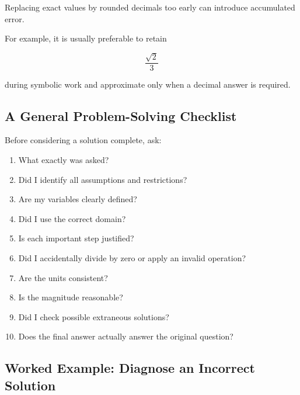 Replacing exact values by rounded decimals too early can introduce accumulated
error.

For example, it is usually preferable to retain

\[ \frac{\sqrt2}{3} \]

during symbolic work and approximate only when a decimal answer is required.

\subsection{A General Problem-Solving Checklist}
\label{subsec:problem-solving-checklist}

Before considering a solution complete, ask:

\begin{enumerate}
    \item What exactly was asked?
    \item Did I identify all assumptions and restrictions?
    \item Are my variables clearly defined?
    \item Did I use the correct domain?
    \item Is each important step justified?
    \item Did I accidentally divide by zero or apply an invalid operation?
    \item Are the units consistent?
    \item Is the magnitude reasonable?
    \item Did I check possible extraneous solutions?
    \item Does the final answer actually answer the original question?
\end{enumerate}

\subsection{Worked Example: Diagnose an Incorrect Solution}
\label{subsec:worked-diagnose-solution}


